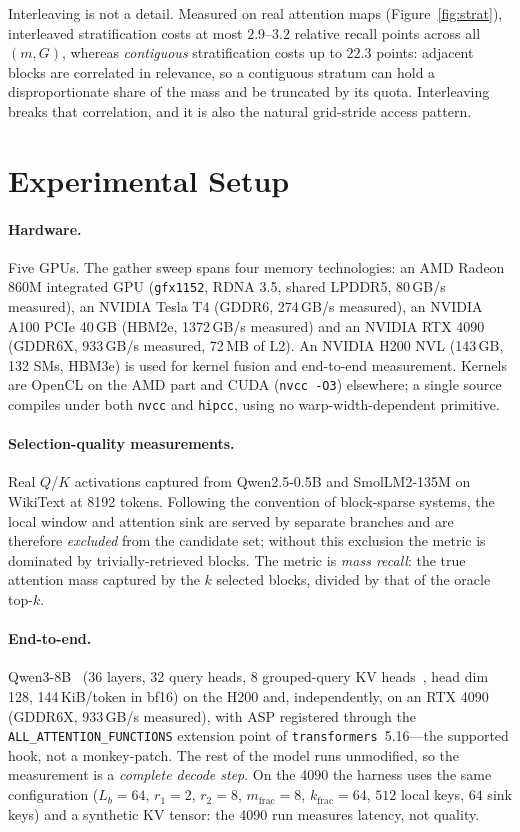 \documentclass[sigconf,nonacm,11pt]{acmart}
\begin{document}
Interleaving is not a detail. Measured on real attention maps (Figure~\ref{fig:strat}),
interleaved stratification costs at most $2.9$--$3.2$ relative recall points across
all $(m,G)$, whereas \emph{contiguous} stratification costs up to $22.3$ points:
adjacent blocks are correlated in relevance, so a contiguous stratum can hold a
disproportionate share of the mass and be truncated by its quota. Interleaving
breaks that correlation, and it is also the natural grid-stride access pattern.

\section{Experimental Setup}

\paragraph{Hardware.} Five GPUs. The gather sweep spans four memory
technologies: an AMD Radeon 860M integrated GPU (\texttt{gfx1152}, RDNA 3.5,
shared LPDDR5, 80\,GB/s measured), an NVIDIA Tesla T4 (GDDR6, 274\,GB/s
measured), an NVIDIA A100 PCIe 40\,GB (HBM2e, 1372\,GB/s measured) and an NVIDIA
RTX 4090 (GDDR6X, 933\,GB/s measured, 72\,MB of L2). An NVIDIA H200 NVL
(143\,GB, 132 SMs, HBM3e) is used for kernel fusion and end-to-end measurement. Kernels are OpenCL on the AMD part and CUDA
(\texttt{nvcc -O3}) elsewhere; a single source compiles under both \texttt{nvcc}
and \texttt{hipcc}, using no warp-width-dependent primitive.

\paragraph{Selection-quality measurements.} Real $Q$/$K$ activations captured from
Qwen2.5-0.5B and SmolLM2-135M on WikiText at 8192 tokens. Following the
convention of block-sparse systems, the local window and attention sink are
served by separate branches and are therefore \emph{excluded} from the candidate
set; without this exclusion the metric is dominated by trivially-retrieved blocks.
The metric is \emph{mass recall}: the true attention mass captured by the $k$
selected blocks, divided by that of the oracle top-$k$.

\paragraph{End-to-end.} Qwen3-8B~\cite{qwen3} (36 layers, 32 query heads, 8 grouped-query
KV heads~\cite{ainslie2023gqa}, head dim 128, 144\,KiB/token in bf16) on the H200 and, independently, on an
RTX 4090 (GDDR6X, 933\,GB/s measured), with ASP registered
through the \texttt{ALL\_ATTENTION\_\allowbreak FUNCTIONS} extension point of
\texttt{transformers}~5.16---the supported hook, not a monkey-patch. The rest of
the model runs unmodified, so the measurement is a \emph{complete decode step}.
On the 4090 the harness uses the same configuration ($L_b=64$, $r_1=2$, $r_2=8$,
$m_{\text{frac}}=8$, $k_{\text{frac}}=64$, $512$ local keys, $64$ sink keys) and a
synthetic KV tensor: the 4090 run measures latency, not quality.
\end{document}
